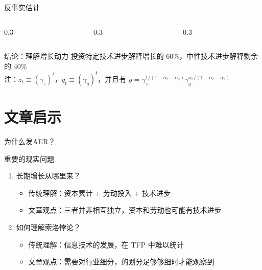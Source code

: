 \documentclass[aspectratio=169,10pt]{beamer}
\begin{document}
\begin{frame}{反事实估计}
  \begin{columns}[T,onlytextwidth]
    \begin{column}{0.3\linewidth}
    \end{column}
    \begin{column}{0.3\linewidth}
    \end{column}
    \begin{column}{0.3\linewidth}
    \end{column}
  \end{columns}
  \vspace{1em}
  \begin{block}{结论：理解增长动力}
    投资特定技术进步解释增长的 60\%，中性技术进步解释剩余的 40\% \\
    {
    \scriptsize
    注：$ z_t \equiv \left(\gamma_z\right)^t， q_t \equiv \left(\gamma_q\right)^t$，并且有 $ g = \gamma_z^{1/(1-\alpha_e - \alpha_s)} \gamma_q^{\alpha_e/(1-\alpha_e - \alpha_s)}$
    }
  \end{block}



\end{frame}


\section{文章启示}
\begin{frame}{为什么发AER？}
  \begin{block}{重要的现实问题}
    \begin{enumerate}
      \item 长期增长从哪里来？
            \begin{itemize}
              \item 传统理解：资本累计 + 劳动投入 + 技术进步
              \item 文章观点：三者并非相互独立，资本和劳动也可能有技术进步
            \end{itemize}
      \item 如何理解索洛悖论？
            \begin{itemize}
              \item 传统理解：信息技术的发展，在 TFP 中难以统计
              \item 文章观点：需要对行业细分，的划分足够够细时才能观察到
            \end{itemize}
    \end{enumerate}
  \end{block}
\end{frame}
\end{document}
